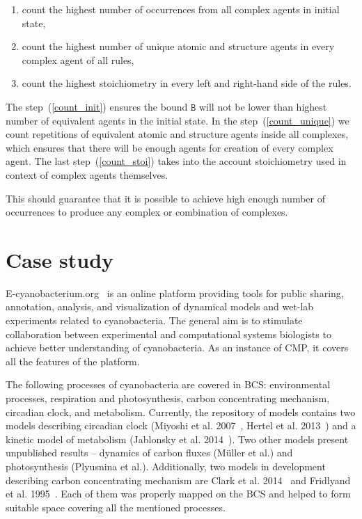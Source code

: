 \documentclass[12pt, twoside]{fithesis2} %
\begin{document}
\begin{enumerate}
  \item \label{count_init} count the highest number of occurrences from all complex agents in initial state,
  \item \label{count_unique} count the highest number of unique atomic and structure agents in every complex agent of all rules,
  \item \label{count_stoi} count the highest stoichiometry in every left and right-hand side of the rules.
\end{enumerate}

The step~(\ref{count_init}) ensures the bound $\mathtt{B}$ will not be lower than highest number of equivalent agents in the initial state. In the step~(\ref{count_unique}) we count repetitions of equivalent atomic and structure agents inside all complexes, which ensures that there will be enough agents for creation of every complex agent. The last step~(\ref{count_stoi}) takes into the account stoichiometry used in context of complex agents themselves.

This should guarantee that it is possible to achieve high enough number of occurrences to produce any complex or combination of complexes.

\chapter{Case study}
\label{case_study}

E-cyanobacterium.org~\cite{Trojak2016} is an online platform providing tools for public sharing, annotation, analysis, and visualization of dynamical models and wet-lab experiments related to cyanobacteria. The general aim is to stimulate collaboration between experimental and computational systems biologists to achieve better understanding of cyanobacteria. As an instance of CMP, it covers all the features of the platform.

The following processes of cyanobacteria are covered in BCS: environmental processes, respiration and photosynthesis, carbon concentrating mechanism, circadian clock, and metabolism. Currently, the repository of models contains two models describing circadian clock (Miyoshi et al. 2007~\cite{Miyoshi01022007}, Hertel et al. 2013~\cite{Hertel2013}) and a kinetic model of metabolism (Jablonsky et al. 2014~\cite{Jablonsky2014}). Two other models present unpublished results -- dynamics of carbon fluxes (M\"{u}ller et al.) and photosynthesis (Plyusnina et al.). Additionally, two models in development describing carbon concentrating mechanism are Clark et al. 2014~\cite{clark2014insights} and Fridlyand et al. 1995~\cite{fridlyand1996quantitative}. Each of them was properly mapped on the BCS and helped to form suitable space covering all the mentioned processes.
\end{document}

